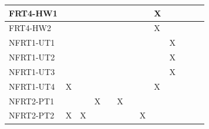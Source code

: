 \documentclass[12pt, titlepage]{article}
\begin{document}
\begin{table}[ht]
{\begin{tabular}{lllllllllllll}
\multicolumn{1}{|l|}{FRT4-HW1}   & \multicolumn{1}{l|}{}  & \multicolumn{1}{l|}{}  & \multicolumn{1}{l|}{}  & \multicolumn{1}{l|}{}  & \multicolumn{1}{l|}{}  & \multicolumn{1}{l|}{}  & \multicolumn{1}{l|}{}  & \multicolumn{1}{l|}{X}  & \multicolumn{1}{l|}{}  & \multicolumn{1}{l|}{}   & \multicolumn{1}{l|}{}  & \multicolumn{1}{l|}{}      \\ \hline
\multicolumn{1}{|l|}{FRT4-HW2}   & \multicolumn{1}{l|}{}  & \multicolumn{1}{l|}{}  & \multicolumn{1}{l|}{}  & \multicolumn{1}{l|}{}  & \multicolumn{1}{l|}{}  & \multicolumn{1}{l|}{}  & \multicolumn{1}{l|}{}  & \multicolumn{1}{l|}{X}  & \multicolumn{1}{l|}{}  & \multicolumn{1}{l|}{}   & \multicolumn{1}{l|}{}  & \multicolumn{1}{l|}{}      \\ \hline
\multicolumn{1}{|l|}{NFRT1-UT1}   & \multicolumn{1}{l|}{}  & \multicolumn{1}{l|}{}  & \multicolumn{1}{l|}{}  & \multicolumn{1}{l|}{}  & \multicolumn{1}{l|}{}  & \multicolumn{1}{l|}{}  & \multicolumn{1}{l|}{}  & \multicolumn{1}{l|}{}  & \multicolumn{1}{l|}{X}  & \multicolumn{1}{l|}{}   & \multicolumn{1}{l|}{}  & \multicolumn{1}{l|}{}      \\ \hline
\multicolumn{1}{|l|}{NFRT1-UT2}   & \multicolumn{1}{l|}{}  & \multicolumn{1}{l|}{}  & \multicolumn{1}{l|}{}  & \multicolumn{1}{l|}{}  & \multicolumn{1}{l|}{}  & \multicolumn{1}{l|}{}  & \multicolumn{1}{l|}{}  & \multicolumn{1}{l|}{}  & \multicolumn{1}{l|}{X}  & \multicolumn{1}{l|}{}   & \multicolumn{1}{l|}{}  & \multicolumn{1}{l|}{}      \\ \hline
\multicolumn{1}{|l|}{NFRT1-UT3}   & \multicolumn{1}{l|}{}  & \multicolumn{1}{l|}{}  & \multicolumn{1}{l|}{}  & \multicolumn{1}{l|}{}  & \multicolumn{1}{l|}{}  & \multicolumn{1}{l|}{}  & \multicolumn{1}{l|}{}  & \multicolumn{1}{l|}{}  & \multicolumn{1}{l|}{X}  & \multicolumn{1}{l|}{}   & \multicolumn{1}{l|}{}  & \multicolumn{1}{l|}{}     \\ \hline
\multicolumn{1}{|l|}{NFRT1-UT4}   & \multicolumn{1}{l|}{X}  & \multicolumn{1}{l|}{}  & \multicolumn{1}{l|}{}  & \multicolumn{1}{l|}{}  & \multicolumn{1}{l|}{}  & \multicolumn{1}{l|}{}  & \multicolumn{1}{l|}{}  & \multicolumn{1}{l|}{X}  & \multicolumn{1}{l|}{}  & \multicolumn{1}{l|}{}   & \multicolumn{1}{l|}{}  & \multicolumn{1}{l|}{}      \\ \hline
\multicolumn{1}{|l|}{NFRT2-PT1}   & \multicolumn{1}{l|}{}  & \multicolumn{1}{l|}{}  & \multicolumn{1}{l|}{X}  & \multicolumn{1}{l|}{}  & \multicolumn{1}{l|}{X}  & \multicolumn{1}{l|}{}  & \multicolumn{1}{l|}{}  & \multicolumn{1}{l|}{}  & \multicolumn{1}{l|}{}  & \multicolumn{1}{l|}{}   & \multicolumn{1}{l|}{}  & \multicolumn{1}{l|}{}      \\ \hline
\multicolumn{1}{|l|}{NFRT2-PT2}   & \multicolumn{1}{l|}{X}  & \multicolumn{1}{l|}{X}  & \multicolumn{1}{l|}{}  & \multicolumn{1}{l|}{}  & \multicolumn{1}{l|}{}  & \multicolumn{1}{l|}{}  & \multicolumn{1}{l|}{X}  & \multicolumn{1}{l|}{}  & \multicolumn{1}{l|}{}  & \multicolumn{1}{l|}{}   & \multicolumn{1}{l|}{}  & \multicolumn{1}{l|}{}      \\ \hline
\end{tabular}}
\end{table}
\end{document}
